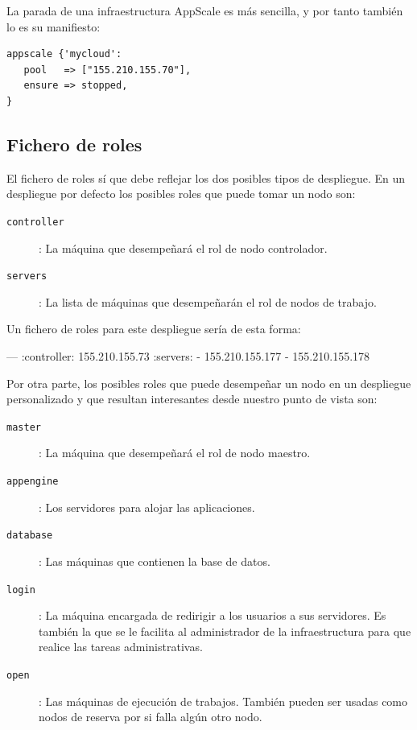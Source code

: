 La parada de una infraestructura AppScale es más sencilla, y por tanto también lo es su manifiesto:

\begin{lstlisting}
appscale {'mycloud':
   pool   => ["155.210.155.70"],
   ensure => stopped,
}
\end{lstlisting}

\subsection{Fichero de roles}

El fichero de roles sí que debe reflejar los dos posibles tipos de despliegue. En un despliegue por defecto los posibles roles que puede tomar un nodo son:

\begin{description}
\item[\texttt{controller}]: La máquina que desempeñará el rol de nodo controlador.
\item[\texttt{servers}]: La lista de máquinas que desempeñarán el rol de nodos de trabajo.
\end{description}

Un fichero de roles para este despliegue sería de esta forma:

\begin{yamlcode}
--- 
:controller: 155.210.155.73
:servers: 
- 155.210.155.177
- 155.210.155.178
\end{yamlcode}

Por otra parte, los posibles roles que puede desempeñar un nodo en un despliegue personalizado y que resultan interesantes desde nuestro punto de vista son:

\begin{description}
\item[\texttt{master}]: La máquina que desempeñará el rol de nodo maestro.
\item[\texttt{appengine}]: Los servidores para alojar las aplicaciones.
\item[\texttt{database}]: Las máquinas que contienen la base de datos.
\item[\texttt{login}]: La máquina encargada de redirigir a los usuarios a sus servidores. Es también la que se le facilita al administrador de la infraestructura para que realice las tareas administrativas.
\item[\texttt{open}]: Las máquinas de ejecución de trabajos. También pueden ser usadas como nodos de reserva por si falla algún otro nodo.
\end{description}

